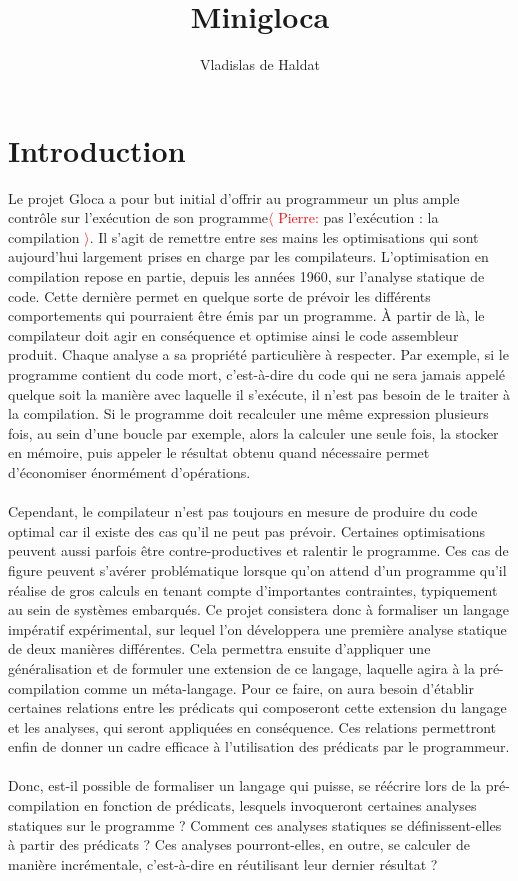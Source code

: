 \documentclass[a4paper, 10pt]{article}
\title{Minigloca}
\author{Vladislas de Haldat}
\begin{document}


\maketitle
\newpage
\tableofcontents
\newpage

\newcommand{\pierre}[1]{\textcolor{red}{$\langle$ Pierre:} #1 \textcolor{red}{$\rangle$}}

\section{Introduction}
Le projet Gloca a pour but initial d'offrir au programmeur un plus ample contrôle sur l'exécution de son programme\pierre{pas l'exécution : la compilation}.
Il s'agit de remettre entre ses mains les optimisations qui sont aujourd'hui largement prises en charge par les compilateurs. L'optimisation en compilation repose en partie, depuis les années 1960, sur l'analyse statique de code. Cette
dernière permet en quelque sorte de prévoir les différents comportements qui pourraient être émis par un programme. À partir de là, le
compilateur doit agir en conséquence et optimise ainsi le code assembleur produit. Chaque analyse a sa propriété particulière à respecter.
Par exemple, si le programme contient du code mort, c'est-à-dire du code qui ne sera jamais appelé quelque soit la manière avec laquelle
il s'exécute, il n'est pas besoin de le traiter à la compilation. Si le programme doit recalculer une même expression plusieurs fois, au sein 
d'une boucle par exemple, alors la calculer une seule fois, la stocker en mémoire, puis appeler le résultat obtenu quand nécessaire permet 
d'économiser énormément d'opérations.
\\
\\
Cependant, le compilateur n'est pas toujours en mesure de produire du code optimal car il existe des cas qu'il ne peut pas prévoir. Certaines
optimisations peuvent aussi parfois être contre-productives et ralentir le programme. Ces cas de figure peuvent
s'avérer problématique lorsque qu'on attend d'un programme qu'il réalise de gros calculs en tenant compte d'importantes contraintes, typiquement au sein
de systèmes embarqués. Ce projet consistera donc à formaliser un langage impératif expérimental, sur lequel l'on développera une première analyse statique de deux manières
différentes. Cela permettra ensuite d'appliquer une généralisation et de formuler une extension de ce langage, laquelle agira à la pré-compilation comme un méta-langage.
Pour ce faire, on aura besoin d'établir certaines relations entre les prédicats qui composeront cette extension du langage et les
analyses, qui seront appliquées en conséquence. Ces relations permettront enfin de donner un cadre efficace à l'utilisation des prédicats par le programmeur.
\\
\\
Donc, est-il possible de formaliser un langage qui puisse, se réécrire lors de la pré-compilation en fonction de prédicats, lesquels invoqueront certaines
analyses statiques sur le programme ? Comment ces analyses statiques se définissent-elles à partir des prédicats ? Ces analyses pourront-elles, en outre,
se calculer de manière incrémentale, c'est-à-dire en réutilisant leur dernier résultat ?
\end{document}
